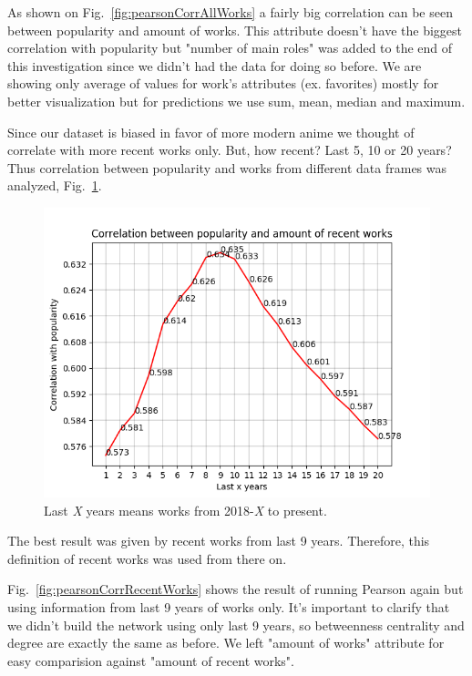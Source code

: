 As shown on Fig.~\ref{fig:pearsonCorrAllWorks} a fairly big correlation can be seen between popularity and amount of works. This attribute doesn't have the biggest correlation with popularity but "number of main roles" was added to the end of this investigation since we didn't had the data for doing so before. 
We are showing only average of values for work's attributes (ex. favorites) mostly for better visualization but for predictions we use sum, mean, median and maximum.

Since our dataset is biased in favor of more modern anime we thought of correlate with more recent works only. But, how recent? Last 5, 10 or 20 years? Thus correlation between popularity and works from different data frames was analyzed, Fig.~\ref{fig:correlationPopRecentWorks}.

\begin{figure}[!h]
	\begin{center}
	\includegraphics[width=\columnwidth]{graphics/correlationPopRecentWorks.png}
	\caption{Last \textit{X} years means works from 2018-\textit{X} to present.}
	\label{fig:correlationPopRecentWorks}
	\end{center}
\end{figure}

The best result was given by recent works from last 9 years. Therefore, this definition of recent works was used from there on.

Fig.~\ref{fig:pearsonCorrRecentWorks} shows the result of running Pearson again but using information from last 9 years of works only. It's important to clarify that we didn't build the network using only last 9 years, so betweenness centrality and degree are exactly the same as before. We left "amount of works" attribute for easy comparision against "amount of recent works".

